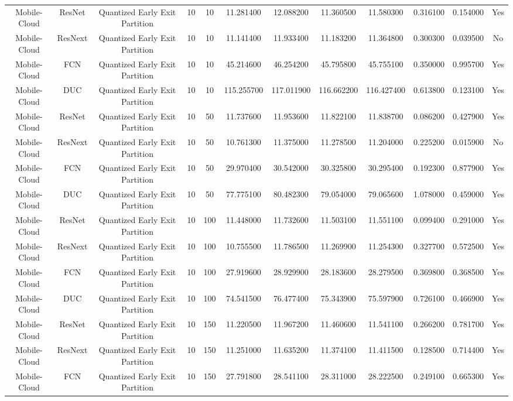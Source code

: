 \begin{tabular}{|c||c||c||c||c||c||c||c||c||c||c||c|}
Mobile-Cloud & ResNet & Quantized Early Exit Partition & 10 & 10 & 11.281400 & 12.088200 & 11.360500 & 11.580300 & 0.316100 & 0.154000 & Yes \\
Mobile-Cloud & ResNext & Quantized Early Exit Partition & 10 & 10 & 11.141400 & 11.933400 & 11.183200 & 11.364800 & 0.300300 & 0.039500 & No \\
Mobile-Cloud & FCN & Quantized Early Exit Partition & 10 & 10 & 45.214600 & 46.254200 & 45.795800 & 45.755100 & 0.350000 & 0.995700 & Yes \\
Mobile-Cloud & DUC & Quantized Early Exit Partition & 10 & 10 & 115.255700 & 117.011900 & 116.662200 & 116.427400 & 0.613800 & 0.123100 & Yes \\
Mobile-Cloud & ResNet & Quantized Early Exit Partition & 10 & 50 & 11.737600 & 11.953600 & 11.822100 & 11.838700 & 0.086200 & 0.427900 & Yes \\
Mobile-Cloud & ResNext & Quantized Early Exit Partition & 10 & 50 & 10.761300 & 11.375000 & 11.278500 & 11.204000 & 0.225200 & 0.015900 & No \\
Mobile-Cloud & FCN & Quantized Early Exit Partition & 10 & 50 & 29.970400 & 30.542000 & 30.325800 & 30.295400 & 0.192300 & 0.877900 & Yes \\
Mobile-Cloud & DUC & Quantized Early Exit Partition & 10 & 50 & 77.775100 & 80.482300 & 79.054000 & 79.065600 & 1.078000 & 0.459000 & Yes \\
Mobile-Cloud & ResNet & Quantized Early Exit Partition & 10 & 100 & 11.448000 & 11.732600 & 11.503100 & 11.551100 & 0.099400 & 0.291000 & Yes \\
Mobile-Cloud & ResNext & Quantized Early Exit Partition & 10 & 100 & 10.755500 & 11.786500 & 11.269900 & 11.254300 & 0.327700 & 0.572500 & Yes \\
Mobile-Cloud & FCN & Quantized Early Exit Partition & 10 & 100 & 27.919600 & 28.929900 & 28.183600 & 28.279500 & 0.369800 & 0.368500 & Yes \\
Mobile-Cloud & DUC & Quantized Early Exit Partition & 10 & 100 & 74.541500 & 76.477400 & 75.343900 & 75.597900 & 0.726100 & 0.466900 & Yes \\
Mobile-Cloud & ResNet & Quantized Early Exit Partition & 10 & 150 & 11.220500 & 11.967200 & 11.460600 & 11.541100 & 0.266200 & 0.781700 & Yes \\
Mobile-Cloud & ResNext & Quantized Early Exit Partition & 10 & 150 & 11.251000 & 11.635200 & 11.374100 & 11.411500 & 0.128500 & 0.714400 & Yes \\
Mobile-Cloud & FCN & Quantized Early Exit Partition & 10 & 150 & 27.791800 & 28.541100 & 28.311000 & 28.222500 & 0.249100 & 0.665300 & Yes \\

\end{tabular}
